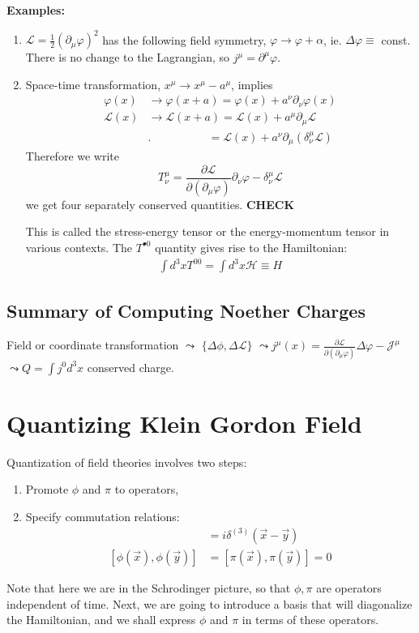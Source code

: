 \documentclass{report}
\theoremstyle{plain}
\theoremstyle{definition}
\theoremstyle{remark}
\newcommand{\FR}[2]{\frac{#1}{#2}}
\newcommand{\mc}{\mathcal}
\newcommand{\vphi}{\varphi}
\newcommand{\di}{\partial}
\newcommand{\ddi}[2]{\FR{\partial {#1}}{\partial {#2}}}
\newcommand{\CHECK}{{\color{blue} \textbf{CHECK}}}
\begin{document}
\textbf{Examples:}
\begin{enumerate}
    \item $\mc L = \FR{1}{2}(\di_\mu \vphi)^2$ has the following field
        symmetry, $\vphi \to \vphi+\alpha$, ie. $\Delta\vphi \equiv$ const.
        There is no change to the Lagrangian, so $j^\mu = \di^\mu \vphi$.
    \item Space-time transformation, $x^\mu \to x^\mu-a^\mu$, implies
        \begin{align*}
        \vphi(x) &\to \vphi(x+a) = \vphi(x) + a^\nu\di_\nu\vphi(x)\\
        \mc L(x) &\to \mc L(x+a) = \mc L(x) + a^\mu\di_\mu \mc L\\
                 &. \quad\qquad\qquad = \mc L(x) +
                 a^\nu\di_\mu(\delta^\mu_\nu \mc L)
        \end{align*}
        Therefore we write 
        \[T^\mu_\nu = \ddi{\mc L}{(\di_\mu\vphi)}\di_\nu\vphi -
        \delta^\mu_\nu\mc L\]
        we get four separately conserved quantities. \CHECK

        This is called the stress-energy tensor or the energy-momentum
        tensor in various contexts.
        The $T^{\bullet 0}$ quantity gives rise to the Hamiltonian:
        \begin{align*}
            \int d^3x T^{00} = \int d^3x \mc H \equiv H
        \end{align*}

\end{enumerate}

\subsection{Summary of Computing Noether Charges}
Field or coordinate transformation $\leadsto$ $\{\Delta\phi,\Delta\mc L\}$
$\leadsto j^\mu(x) = \ddi{\mc L}{(\di_\mu\vphi)}\Delta\vphi - \mc J^\mu$
$\leadsto Q = \int j^0 d^3x$ conserved charge.

\section{Quantizing Klein Gordon Field}
Quantization of field theories involves two steps:
\begin{enumerate}
    \item Promote $\phi$ and $\pi$ to operators,
    \item Specify commutation relations:
        \begin{align*}
            [\phi(\vec x),\pi(\vec y)] &= i\delta^{(3)}(\vec x-\vec y)\\
            [\phi(\vec x),\phi(\vec y)] &= [\pi(\vec x),\pi(\vec y)] = 0
        \end{align*}
\end{enumerate}
Note that here we are in the Schrodinger picture, so that $\phi,\pi$ are
operators independent of time. Next, we are going to introduce a
basis that will diagonalize the Hamiltonian, and we shall express $\phi$
and $\pi$ in terms of these operators.
\end{document}
